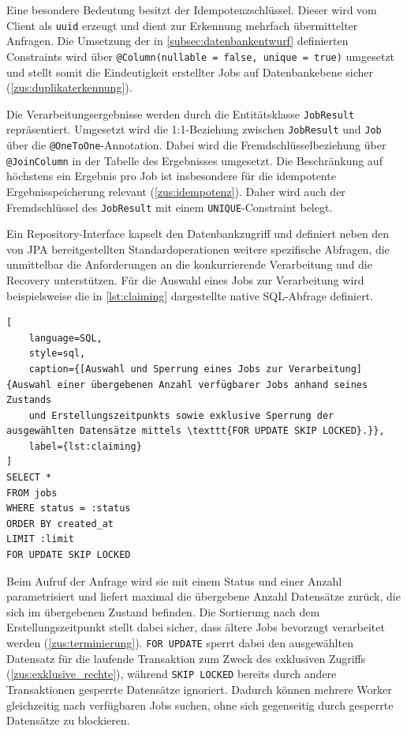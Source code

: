 Eine besondere Bedeutung besitzt der Idempotenzschlüssel.
Dieser wird vom Client als \texttt{\gls{uuid}} erzeugt und dient zur Erkennung mehrfach übermittelter Anfragen.
Die Umsetzung der in \cref{subsec:datenbankentwurf} definierten Constraints wird über \texttt{@Column(nullable = false, unique = true)}
umgesetzt und stellt somit die Eindeutigkeit erstellter Jobs auf Datenbankebene sicher (\ref{zus:duplikaterkennung}).

Die Verarbeitungsergebnisse werden durch die Entitätsklasse \texttt{JobResult} repräsentiert.
Umgesetzt wird die 1:1-Beziehung zwischen \texttt{JobResult} und \texttt{Job} über die \texttt{@OneToOne}-Annotation.
Dabei wird die Fremdschlüsselbeziehung über \texttt{@JoinColumn} in der Tabelle des Ergebnisses umgesetzt.
Die Beschränkung auf höchstens ein Ergebnis pro Job ist insbesondere für die idempotente Ergebnisspeicherung relevant (\ref{zus:idempotenz}).
Daher wird auch der Fremdschlüssel des \texttt{JobResult} mit einem \texttt{UNIQUE}-Constraint belegt.

Ein Repository-Interface kapselt den Datenbankzugriff und definiert neben den von JPA bereitgestellten Standardoperationen
weitere spezifische Abfragen, die unmittelbar die Anforderungen an die konkurrierende Verarbeitung und die Recovery unterstützen.
Für die Auswahl eines Jobs zur Verarbeitung wird beispielsweise die in \cref{lst:claiming} dargestellte native SQL-Abfrage definiert.

\begin{lstlisting}[
    language=SQL,
    style=sql,
    caption={[Auswahl und Sperrung eines Jobs zur Verarbeitung]{Auswahl einer übergebenen Anzahl verfügbarer Jobs anhand seines Zustands
    und Erstellungszeitpunkts sowie exklusive Sperrung der ausgewählten Datensätze mittels \texttt{FOR UPDATE SKIP LOCKED}.}},
    label={lst:claiming}
]
SELECT *
FROM jobs
WHERE status = :status
ORDER BY created_at
LIMIT :limit
FOR UPDATE SKIP LOCKED
\end{lstlisting}

Beim Aufruf der Anfrage wird sie mit einem Status und einer Anzahl parametrisiert und liefert maximal die übergebene Anzahl
Datensätze zurück, die sich im übergebenen Zustand befinden.
Die Sortierung nach dem Erstellungszeitpunkt stellt dabei sicher, dass ältere Jobs bevorzugt verarbeitet werden (\ref{zus:terminierung}).
\texttt{FOR UPDATE} sperrt dabei den ausgewählten Datensatz für die laufende Transaktion zum Zweck des exklusiven Zugriffs
(\ref{zus:exklusive_rechte}), während \texttt{SKIP LOCKED} bereits durch andere Transaktionen gesperrte Datensätze ignoriert.
Dadurch können mehrere Worker gleichzeitig nach verfügbaren Jobs suchen, ohne sich gegenseitig durch gesperrte Datensätze
zu blockieren.

